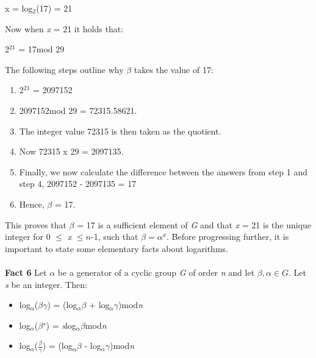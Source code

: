 \documentclass[iwp,first]{luthesis}
\begin{document}
\begin{center}
x = log$_2$(17) = 21
\end{center}

Now when \textit{x} = 21 it holds that:

\begin{center}
2$^{21}$ = 17mod 29
\end{center}

The following steps outline why \textit{$\beta$} takes the value of 17:

\begin{center}

\begin{enumerate}

\item 2$^{21}$ = 2097152 

\item 2097152mod 29 = 72315.58621. 

\item The integer value 72315 is then taken as the quotient.

\item Now 72315 x 29 = 2097135.

\item Finally, we now calculate the difference between the answers from step 1 and step 4, 2097152 - 2097135 = 17

\item Hence, \textit{$\beta$} = 17.

\end{enumerate}

\end{center}

This proves that \textit{$\beta$} = 17 is a sufficient element of \textit{G} and that \textit{x} = 21 is the unique integer for 0 $\leq$ \textit{x} $\leq n$-1, such that \textit{$\beta = \alpha^x$}. Before progressing further, it is important to state some elementary facts about logarithms.
\\
\\
\textbf{Fact 6} Let $\alpha$ be a generator of a cyclic group \textit{G} of order \textit{n} and let \textit{$\beta,\alpha\in G$}. Let \textit{s} be an integer. Then:

\begin{center}
\begin{itemize}

\item log$_\alpha$($\beta$$\gamma$) = (log$_\alpha$$\beta$ + log$_\alpha$$\gamma$)mod\textit{n}

\item log$_\alpha$($\beta$$^s$) = \textit{s}log$_\alpha$$\beta$mod\textit{n}

\item log$_\alpha$($\frac{\beta}{\gamma}$) = (log$_\alpha$$\beta$ - log$_\alpha$$\gamma$)mod\textit{n}

\end{itemize}
\end{center}
\end{document}
